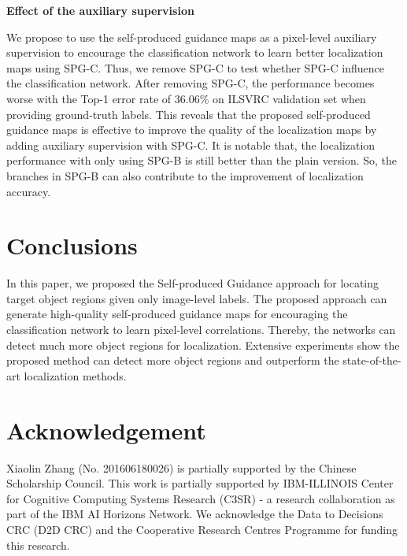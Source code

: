 \documentclass[runningheads]{llncs}
\begin{document}
\textbf{Effect of the auxiliary supervision}

We propose to use the self-produced guidance maps as a pixel-level auxiliary supervision to encourage the classification network to learn better localization maps using SPG-C.
Thus, we remove SPG-C to test whether SPG-C influence the classification network.
After removing SPG-C, the performance becomes worse with the Top-1 error rate of 36.06\% on ILSVRC validation set when providing ground-truth labels.
This reveals that the proposed self-produced guidance maps is effective to improve the quality of the localization maps by adding auxiliary supervision with SPG-C.
It is notable that, the localization performance with only using SPG-B is still better than the plain version.
So, the branches in SPG-B can also contribute to the improvement of localization accuracy.
 \section{Conclusions}
In this paper, we proposed the Self-produced Guidance approach for locating target object regions given only image-level labels.
The proposed approach can generate high-quality self-produced guidance maps for encouraging the classification network to learn pixel-level correlations.
Thereby, the networks can detect much more object regions for localization.
Extensive experiments show the proposed method can detect more object regions and outperform the state-of-the-art localization methods.
 
\section*{Acknowledgement}
Xiaolin Zhang (No. 201606180026) is partially supported by the Chinese Scholarship Council.
This work is partially supported by IBM-ILLINOIS Center for Cognitive Computing Systems Research (C3SR) - a research collaboration as part of the IBM AI Horizons Network.
We acknowledge the Data to Decisions CRC (D2D CRC) and the Cooperative Research Centres Programme for funding this research.



\clearpage



\end{document}
